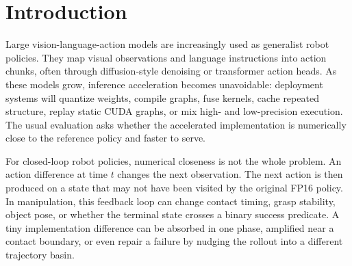 \documentclass[10pt]{article}
\begin{document}
\begin{abstract}
The empirical picture is non-monotonic. Speed-only action-head compilation gives a 2.23$\times$ median server-latency speedup on a 33-case GR00T N1.5 probe, yet reduces success from 19/33 to 16/33. CLSG-TS recovers behavior without simply reverting to FP16: an early-block eager island reaches 18/33 at 2.31$\times$ speedup, and a fine duration probe finds that protecting policy steps 0--120 restores 19/33 at 69.66 ms versus 156.22 ms for FP16. Held-out validation then changes the conclusion from ``choose the local winner'' to ``choose a point on a speed--risk frontier.'' Across two N1.5 30-case folds, speed-only execution is fastest but has 7 paired regressions; the 0--120 duration tactic and a combined early-block plus 0--120 tactic both reach 47/60 pooled success with different speed--risk trade-offs. On GR00T N1.7, we instantiate CLSG-TS as a small Bayesian/active search over duration-window tactics: a warm-start probe and one BO batch identify a behavior-first 0--20 window and a speed-constrained 2--12 window, which are then validated on new initial states.

We do not claim universal superiority of any single backend or tactic. The contribution is a method for VLA acceleration under closed-loop risk: estimate which perturbations are sensitive, then select compilation, fallback, kernel, quantization, or routing tactics by matched rollout repair/regression and latency rather than by one-step drift or a single probe winner.
\end{abstract}

\section{Introduction}

Large vision-language-action models are increasingly used as generalist robot policies. They map visual observations and language instructions into action chunks, often through diffusion-style denoising or transformer action heads. As these models grow, inference acceleration becomes unavoidable: deployment systems will quantize weights, compile graphs, fuse kernels, cache repeated structure, replay static CUDA graphs, or mix high- and low-precision execution. The usual evaluation asks whether the accelerated implementation is numerically close to the reference policy and faster to serve.

For closed-loop robot policies, numerical closeness is not the whole problem. An action difference at time $t$ changes the next observation. The next action is then produced on a state that may not have been visited by the original FP16 policy. In manipulation, this feedback loop can change contact timing, grasp stability, object pose, or whether the terminal state crosses a binary success predicate. A tiny implementation difference can be absorbed in one phase, amplified near a contact boundary, or even repair a failure by nudging the rollout into a different trajectory basin.
\end{document}
